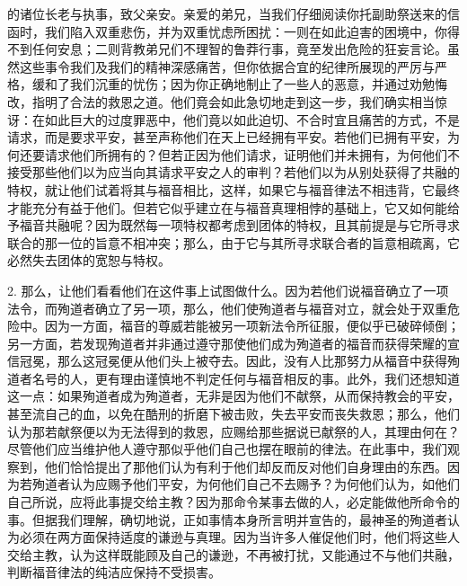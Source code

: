 的诸位长老与执事，致父亲安。亲爱的弟兄，当我们仔细阅读你托副助祭送来的信函时，我们陷入双重悲伤，并为双重忧虑所困扰：一则在如此迫害的困境中，你得不到任何安息；二则背教弟兄们不理智的鲁莽行事，竟至发出危险的狂妄言论。虽然这些事令我们及我们的精神深感痛苦，但你依据合宜的纪律所展现的严厉与严格，缓和了我们沉重的忧伤；因为你正确地制止了一些人的恶意，并通过劝勉悔改，指明了合法的救恩之道。他们竟会如此急切地走到这一步，我们确实相当惊讶：在如此巨大的过度罪恶中，他们竟以如此迫切、不合时宜且痛苦的方式，不是请求，而是要求平安，甚至声称他们在天上已经拥有平安。若他们已拥有平安，为何还要请求他们所拥有的？但若正因为他们请求，证明他们并未拥有，为何他们不接受那些他们以为应当向其请求平安之人的审判？若他们以为从别处获得了共融的特权，就让他们试着将其与福音相比，这样，如果它与福音律法不相违背，它最终才能充分有益于他们。但若它似乎建立在与福音真理相悖的基础上，它又如何能给予福音共融呢？因为既然每一项特权都考虑到团体的特权，且其前提是与它所寻求联合的那一位的旨意不相冲突；那么，由于它与其所寻求联合者的旨意相疏离，它必然失去团体的宽恕与特权。\par

2. 那么，让他们看看他们在这件事上试图做什么。因为若他们说福音确立了一项法令，而殉道者确立了另一项，那么，他们使殉道者与福音对立，就会处于双重危险中。因为一方面，福音的尊威若能被另一项新法令所征服，便似乎已破碎倾倒；另一方面，若发现殉道者并非通过遵守那使他们成为殉道者的福音而获得荣耀的宣信冠冕，那么这冠冕便从他们头上被夺去。因此，没有人比那努力从福音中获得殉道者名号的人，更有理由谨慎地不判定任何与福音相反的事。此外，我们还想知道这一点：如果殉道者成为殉道者，无非是因为他们不献祭，从而保持教会的平安，甚至流自己的血，以免在酷刑的折磨下被击败，失去平安而丧失救恩；那么，他们认为那若献祭便以为无法得到的救恩，应赐给那些据说已献祭的人，其理由何在？尽管他们应当维护他人遵守那似乎他们自己也摆在眼前的律法。在此事中，我们观察到，他们恰恰提出了那他们认为有利于他们却反而反对他们自身理由的东西。因为若殉道者认为应赐予他们平安，为何他们自己不去赐予？为何他们认为，如他们自己所说，应将此事提交给主教？因为那命令某事去做的人，必定能做他所命令的事。但据我们理解，确切地说，正如事情本身所言明并宣告的，最神圣的殉道者认为必须在两方面保持适度的谦逊与真理。因为当许多人催促他们时，他们将这些人交给主教，认为这样既能顾及自己的谦逊，不再被打扰，又能通过不与他们共融，判断福音律法的纯洁应保持不受损害。\par

